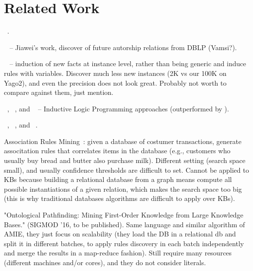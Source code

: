 \section{Related Work}
\amie~\cite{galarraga2015fast}.

~\cite{zhu2011mining} -- Jiawei's work, discover of future autorship relations from DBLP (Vamsi?).

~\cite{abedjan2014amending} -- induction of new facts at instance level, rather than being generic and induce rules with variables. Discover much less new instances (2K vs our 100K on Yago2), and even the precision does not look great. Probably not worth to compare against them, just mention.

~\cite{muggleton1995inverse}, ~\cite{dehaspe1999discovery}, and ~\cite{schoenmackers2010learning} -- Inductive Logic Programming approaches (outperformed by \amie).

\yago~\cite{suchanek2007yago}, \dbpedia~\cite{bizer2009dbpedia}, and \wikidata~\cite{vrandevcic2014wikidata}.

Association Rules Mining~\cite{agrawal1993mining}: given a database of costumer transactions, generate associtation rules that correlates items in the database (e.g., customers who usually buy bread and butter also purchase milk). Different setting (search space small), and usually confidence thresholds are difficult to set. Cannot be applied to KBs because building a relational database from a graph means compute all possible instantiations of a given relation, which makes the search space too big (this is why traditional databases algorithms are difficult to apply over KBs).

"Ontological Pathfinding: Mining First-Order Knowledge from Large Knowledge Bases." (SIGMOD '16, to be published). Same language and similar algorithm of AMIE, they just focus on scalability (they load the DB in a relational db and split it in different batches, to apply rules discovery in each batch independently and merge the results in a map-reduce fashion). Still require many resources (different machines and/or cores), and they do not consider literals.


